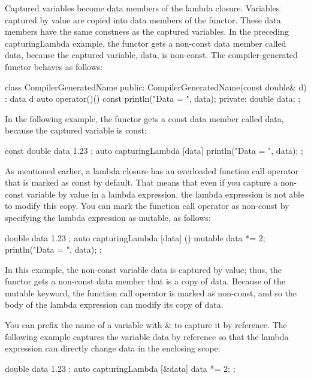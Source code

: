 Captured variables become data members of the lambda closure. Variables captured by value are copied into data members of the functor. These data members have the same constness as the captured variables. In the preceding capturingLambda example, the functor gets a non-const data member called data, because the captured variable, data, is non-const. The compiler-generated functor behaves as follows:

\begin{cpp}
class CompilerGeneratedName
{
    public:
        CompilerGeneratedName(const double& d) : data { d } {}
        auto operator()() const { println("Data = {}", data); }
    private:
        double data;
};
\end{cpp}

In the following example, the functor gets a const data member called data, because the captured variable is const:

\begin{cpp}
const double data { 1.23 };
auto capturingLambda { [data]{ println("Data = {}", data); } };
\end{cpp}

As mentioned earlier, a lambda closure has an overloaded function call operator that is marked as const by default. That means that even if you capture a non-const variable by value in a lambda expression, the lambda expression is not able to modify this copy. You can mark the function call operator as non-const by specifying the lambda expression as mutable, as follows:

\begin{cpp}
double data { 1.23 };
auto capturingLambda {
    [data] () mutable { data *= 2; println("Data = {}", data); } };
\end{cpp}

In this example, the non-const variable data is captured by value; thus, the functor gets a non-const data member that is a copy of data. Because of the mutable keyword, the function call operator is marked as non-const, and so the body of the lambda expression can modify its copy of data.

You can prefix the name of a variable with \& to capture it by reference. The following example captures the variable data by reference so that the lambda expression can directly change data in the enclosing scope:

\begin{cpp}
double data { 1.23 };
auto capturingLambda { [&data]{ data *= 2; } };
\end{cpp}

